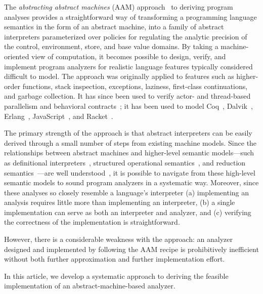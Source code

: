 \documentclass[preprint,onecolumn,9pt]{sigplanconf} %
\begin{document}
The \emph{abstracting abstract machines} (AAM)
approach~\cite{dvanhorn:VanHorn2011Abstracting,dvanhorn:VanHorn2012Systematic}
to deriving program analyses provides a straightforward way of
transforming a programming language semantics in the form of an
abstract machine, into a family of abstract interpreters parameterized
over policies for regulating the analytic precision of the control,
environment, store, and base value domains.  By taking a
machine-oriented view of computation, it becomes possible to design,
verify, and implement program analyzers for realistic language
features typically considered difficult to model.  The approach was
originally applied to features such as higher-order functions,
stack inspection, exceptions, laziness, first-class continuations, and
garbage collection.  It has since been used to verify actor-
\cite{local:DOsualdo:12A} and
thread-based~\cite{dvanhorn:Might2011Family} parallelism and
behavioral contracts~\cite{dvanhorn:TobinHochstadt2012Higherorder}; it
has been used to model Coq~\cite{local:harvard},
Dalvik~\cite{local:dalvik}, Erlang~\cite{local:DOsualdo:12B},
JavaScript~\cite{local:DBLP:journals/corr/abs-1109-4467}, and
Racket~\cite{dvanhorn:TobinHochstadt2012Higherorder}.

The primary strength of the approach is that abstract interpreters can
be easily derived through a small number of steps from existing
machine models.  Since the relationships between abstract machines and
higher-level semantic models---such as definitional
interpreters~\cite{dvanhorn:reynolds-hosc98}, structured operational
semantics~\cite{dvanhorn:Plotkin1981Structural}, and reduction
semantics~\cite{dvanhorn:Felleisen2009Semantics}---are well
understood~\cite{dvanhorn:Danvy:DSc}, it is possible to navigate from
these high-level semantic models to sound program analyzers in a
systematic way.  Moreover, since these analyses so closely resemble a
language's interpreter (a) implementing an analysis requires little
more than implementing an interpreter, (b) a single implementation can
serve as both an interpreter and analyzer, and (c) verifying the
correctness of the implementation is straightforward.

However, there is a considerable weakness with the approach: an
analyzer designed and implemented by following the AAM recipe is
prohibitively inefficient without both further approximation and
further implementation effort.

In this article, we develop a systematic approach to deriving the
feasible implementation of an abstract-machine-based analyzer.
\end{document}
